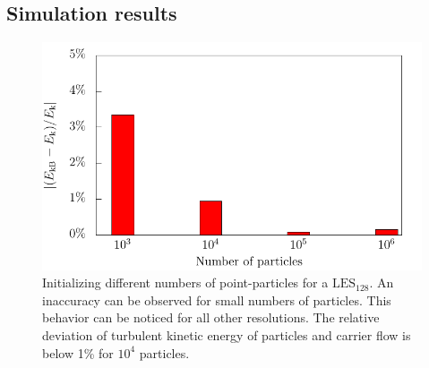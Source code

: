 \documentclass[11pt,a4paper,openany,oneside,parskip=half*]{article}
\begin{document}
\subsection{Simulation results}
\begin{figure}[h]
    \centering
    \begin{minipage}{0.5\textwidth}
        \centering
 	   \includegraphics[width=\linewidth]{./Abbildungen/kineticEnergy_numberOfParticles.pdf}
    \end{minipage}%
        \begin{minipage}{0.5\textwidth}
        \centering
        \caption{Initializing different numbers of point-particles for a $\mathrm{LES_{128}}$. An inaccuracy can be observed for small numbers of particles. This behavior can be noticed for all other resolutions. The relative deviation of turbulent kinetic energy of particles and carrier flow is below 1\% for $10^4$ particles.}
	\label{kineticEnergy_numberofparticles}
    \end{minipage}
    \end{figure}
\end{document}
